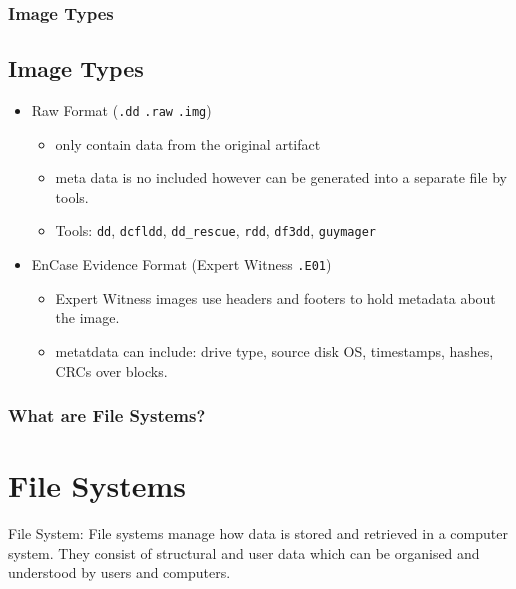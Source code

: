 \documentclass{beamer}
\begin{document}
\begin{frame}
	\frametitle{Image Types}
	\subsection{Image Types}
	\begin{itemize}
		\item Raw Format (\texttt{.dd} \texttt{.raw} \texttt{.img})
		\begin{itemize}
			\item only contain data from the original artifact
			\item meta data is no included however can be generated into a separate file by tools.
			\item Tools: \texttt{dd}, \texttt{dcfldd}, \texttt{dd\_rescue}, \texttt{rdd}, \texttt{df3dd}, \texttt{guymager}
		\end{itemize}
		\item EnCase Evidence Format (Expert Witness \texttt{.E01})
		\begin{itemize}
			\item Expert Witness images use headers and footers to hold metadata about the image.
			\item metatdata can include: drive type, source disk OS, timestamps, hashes, CRCs over blocks.
		\end{itemize}
	\end{itemize}
\end{frame}

\begin{frame}
	\frametitle{What are File Systems?}
	\section{File Systems}
	\begin{block}{File System:}
		File systems manage how data is stored and retrieved in a computer system. They consist of structural and user data which can be organised and understood by users and computers.
	\end{block}
	
		
\end{frame}
\end{document}
